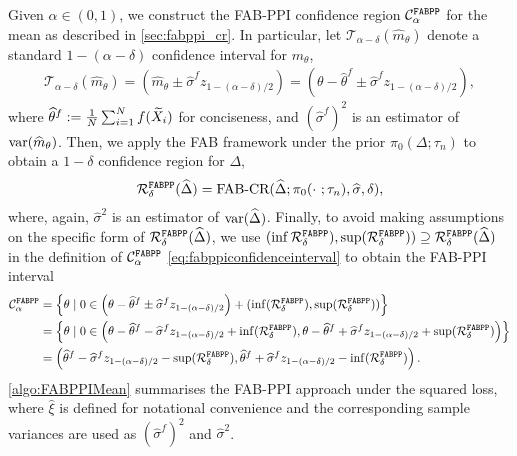 Given $\alpha \in (0, 1)$, we construct the FAB-PPI confidence region $\mathcal C_\alpha^{\mathrm{\texttt{FABPP}}}$ for the mean as described in \cref{sec:fabppi_cr}. In particular, let $\mathcal{T}_{\alpha - \delta}(\widehat m_\theta)$ denote a standard $1 - (\alpha - \delta)$ confidence interval for $m_\theta$,
\begin{align*}
    \mathcal{T}_{\alpha - \delta}(\widehat m_\theta) = (\widehat m_\theta \pm \widehat\sigma^f z_{1 - (\alpha - \delta) / 2}) = \left(\theta - \widehat{\theta}^f \pm \widehat\sigma^f z_{1 - (\alpha - \delta) / 2}\right),
\end{align*}
where $\widehat\theta^f := \frac{1}{N}\sum_{i=1}^N f(\widetilde X_i)$ for conciseness, and $(\widehat\sigma^f)^2$ is an estimator of $\mathrm{var}(\widehat m_\theta)$. Then, we apply the FAB framework under the prior $\pi_0(\Delta; \tau_n)$ to obtain a $1 - \delta$ confidence region for $\Delta$,
\begin{align*}
    \mathcal R^{\mathrm{\texttt{FABPP}}}_\delta(\widehat\Delta) = \text{FAB-CR}(\widehat\Delta; \pi_0(\cdot~;\tau_n), \widehat\sigma, \delta),
\end{align*}
where, again, $\widehat\sigma^2$ is an estimator of $\mathrm{var}(\widehat\Delta)$. Finally, to avoid making assumptions on the specific form of $\mathcal R^{\mathrm{\texttt{FABPP}}}_\delta(\widehat\Delta)$, we use $(\inf\mathcal R^{\mathrm{\texttt{FABPP}}}_\delta), \sup(\mathcal R^{\mathrm{\texttt{FABPP}}}_\delta)) \supseteq \mathcal R^{\mathrm{\texttt{FABPP}}}_\delta(\widehat\Delta)$ in the definition of $\mathcal C_\alpha^{\mathrm{\texttt{FABPP}}}$ \eqref{eq:fabppiconfidenceinterval} to obtain the FAB-PPI interval
\begin{align*}
    \mathcal C_\alpha^{\mathrm{\texttt{FABPP}}} &= \left\{\theta \mid 0\in \left(\theta - \widehat\theta^f \pm \widehat\sigma^f z_{1 - (\alpha - \delta) / 2}\right) + (\inf(\mathcal R^{\mathrm{\texttt{FABPP}}}_\delta), \sup(\mathcal R^{\mathrm{\texttt{FABPP}}}_\delta))\right\} \\
    &= \left\{\theta \mid 0\in \left(\theta - \widehat\theta^f - \widehat\sigma^f z_{1 - (\alpha - \delta) / 2} + \inf(\mathcal R^{\mathrm{\texttt{FABPP}}}_\delta), \theta - \widehat\theta^f + \widehat\sigma^f z_{1 - (\alpha - \delta) / 2} + \sup(\mathcal R^{\mathrm{\texttt{FABPP}}}_\delta)\right)\right\} \\
    &= \left(\widehat\theta^f - \widehat\sigma^f z_{1 - (\alpha - \delta) / 2} - \sup(\mathcal R^{\mathrm{\texttt{FABPP}}}_\delta), \widehat\theta^f + \widehat\sigma^f z_{1 - (\alpha - \delta) / 2} - \inf(\mathcal R^{\mathrm{\texttt{FABPP}}}_\delta)\right).
\end{align*}
\cref{algo:FABPPIMean} summarises the FAB-PPI approach under the squared loss, where $\widehat\xi$ is defined for notational convenience and the corresponding sample variances are used as $(\widehat\sigma^f)^2$ and $\widehat\sigma^2$.
